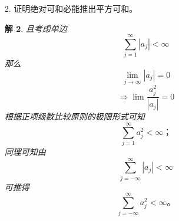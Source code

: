 \documentclass[11pt,a4paper]{ctexart}
\newtheorem*{solution}{解}
\begin{document}
\begin{enumerate}
\begin{solution}
\begin{equation}
\begin{aligned}
&= \sum_{j=-\infty}^{\infty}\sum_{i=-\infty}^{\infty}h_jh_i\sigma^2
\sum_{k=-\infty}^{\infty}a_ka_{k+(t-s)}\\
&= \sigma^2 \sum_{j=-\infty}^{\infty}h_j^2\sum_{k=-\infty}^{\infty}a_ka_{k+(t-s)}
\end{aligned}
\end{equation}
这就说明$\left\lbrace Y_t\right\rbrace$是平稳序列，有自协方差函数
\begin{equation}
\begin{aligned}
\gamma_{l}=\sigma^2 \sum_{j=-\infty}^{\infty}h_j^2\sum_{k=-\infty}^{\infty}a_ka_{k+l},l\in\mathbb{Z}
\end{aligned}
\end{equation}
\end{solution}

\item[2.]证明绝对可和必能推出平方可和。
\begin{solution}
且考虑单边$$\sum_{j=1}^{\infty}|a_j|<\infty$$
那么$$\lim_{j\to\infty}|a_j|=0$$
$$\Rightarrow\lim\frac{a_j^2}{|a_j|}=0$$
根据正项级数比较原则的极限形式可知$$\sum_{j=1}^{\infty}a_j^2<\infty；$$
同理可知由$$\sum_{j=-\infty}^{\infty}|a_j|<\infty$$可推得$$\sum_{j=-\infty}^{\infty}a_j^2<\infty。$$
\end{solution}
\end{enumerate}
\end{document}
